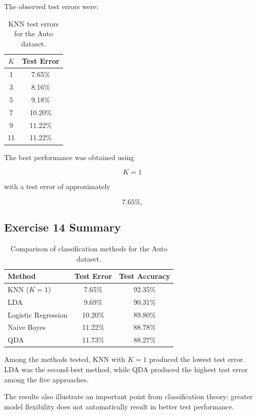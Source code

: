 \documentclass[12pt,a4paper]{article}
\begin{document}
The observed test errors were:

\begin{table}[H]
\centering
\begin{tabular}{cc}
\toprule
$K$ & Test Error \\
\midrule
1 & 7.65\% \\
3 & 8.16\% \\
5 & 9.18\% \\
7 & 10.20\% \\
9 & 11.22\% \\
11 & 11.22\% \\
\bottomrule
\end{tabular}
\caption{KNN test errors for the Auto dataset.}
\end{table}

The best performance was obtained using

\[
\boxed{K=1}
\]

with a test error of approximately

\[
\boxed{7.65\%}.
\]

\subsection{Exercise 14 Summary}

\begin{table}[H]
\centering
\begin{tabular}{lcc}
\toprule
Method & Test Error & Test Accuracy \\
\midrule
KNN ($K=1$) & 7.65\% & 92.35\% \\
LDA & 9.69\% & 90.31\% \\
Logistic Regression & 10.20\% & 89.80\% \\
Naive Bayes & 11.22\% & 88.78\% \\
QDA & 11.73\% & 88.27\% \\
\bottomrule
\end{tabular}
\caption{Comparison of classification methods for the Auto dataset.}
\end{table}

Among the methods tested, KNN with $K=1$ produced the lowest test error.
LDA was the second-best method, while QDA produced the highest test error
among the five approaches.

The results also illustrate an important point from classification theory:
greater model flexibility does not automatically result in better test
performance.

\end{document}
